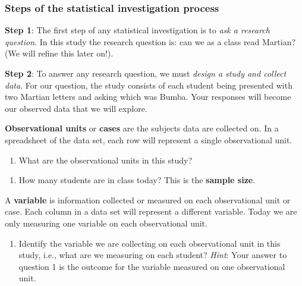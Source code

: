 \documentclass[
]{report}
\providecommand{\tightlist}{%
  \setlength{\itemsep}{0pt}\setlength{\parskip}{0pt}}
\begin{document}
\vspace{0.3in}

\hypertarget{steps-of-the-statistical-investigation-process}{%
\subsubsection*{Steps of the statistical investigation process}\label{steps-of-the-statistical-investigation-process}}

\textbf{Step 1}: The first step of any statistical investigation is to \emph{ask a research question}. In this study the research question is: can we as a class read Martian? (We will refine this later on!).

\textbf{Step 2}: To answer any research question, we must \emph{design a study and collect data}. For our question, the study consists of each student being presented with two Martian letters and asking which was Bumba. Your responses will become our observed data that we will explore.

\textbf{Observational units} or \textbf{cases} are the subjects data are collected on. In a spreadsheet of the data set, each row will represent a single observational unit.

\begin{enumerate}
\def\labelenumi{\arabic{enumi}.}
\setcounter{enumi}{1}
\tightlist
\item
  What are the observational units in this study?
\end{enumerate}

\vspace{0.4in}

\begin{enumerate}
\def\labelenumi{\arabic{enumi}.}
\setcounter{enumi}{2}
\tightlist
\item
  How many students are in class today? This is the \textbf{sample size}.
\end{enumerate}

\vspace{0.3in}

A \textbf{variable} is information collected or measured on each observational unit or case. Each column in a data set will represent a different variable. Today we are only measuring one variable on each observational unit.

\begin{enumerate}
\def\labelenumi{\arabic{enumi}.}
\setcounter{enumi}{3}
\tightlist
\item
  Identify the variable we are collecting on each observational unit in this study, i.e., what are we measuring on each student? \emph{Hint}: Your answer to question 1 is the outcome for the variable measured on one observational unit.
\end{enumerate}
\end{document}
